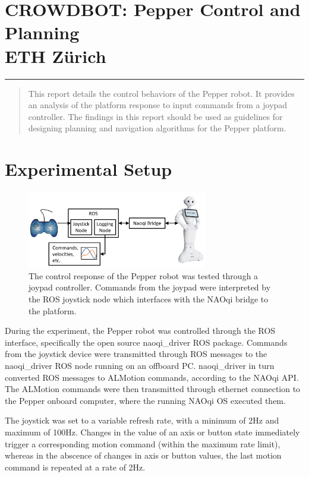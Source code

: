 \documentclass[11pt,a4paper]{article}
\newcommand{\PropTitle}{CROWDBOT: Pepper Control and Planning\\ \small{ETH Z\"{u}rich}}
\begin{document}
\setcounter{page}{1}
\section*{\PropTitle}
\vspace{-0.5cm}
\rule{\textwidth}{0.05cm}
\vspace{0.5cm}
\begin{abstract}
This report details the control behaviors of the Pepper robot. It provides an analysis of the platform response to input commands from a joypad controller. The findings in this report should be used as guidelines for designing planning and navigation algorithms for the Pepper platform.
\end{abstract}

\section{Experimental Setup} \label{sec:setup}

\begin{figure}[h]
\centering
\includegraphics[width=0.7\textwidth]{figures/pepper_control.pdf}
\caption{The control response of the Pepper robot was tested through a joypad controller. Commands from the joypad were interpreted by the ROS joystick node which interfaces with the NAOqi bridge to the platform.} \label{fig:pepper_control}
\end{figure}

During the experiment, the Pepper robot was controlled through the ROS interface, specifically the open source naoqi\_driver ROS package. Commands from the joystick device were transmitted through ROS messages to the naoqi\_driver ROS node running on an offboard PC. naoqi\_driver in turn converted ROS messages to ALMotion commands, according to the NAOqi API. The ALMotion commands were then transmitted through ethernet connection to the Pepper onboard computer, where the running NAOqi OS executed them.

The joystick was set to a variable refresh rate, with a minimum of 2Hz and maximum of 100Hz. Changes in the value of an axis or button state immediately trigger a corresponding motion command (within the maximum rate limit), whereas in the abscence of changes in axis or button values, the last motion command is repeated at a rate of 2Hz.
\end{document}

